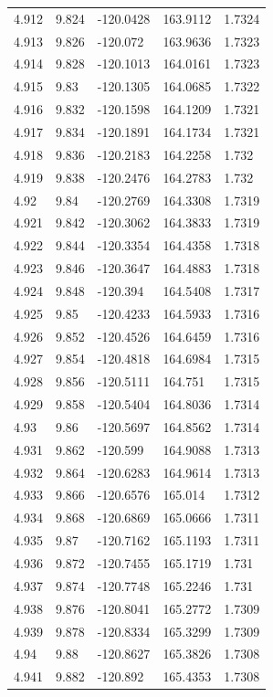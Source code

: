 \begin{tabular}{lllll}
4.912 & 9.824 & -120.0428 & 163.9112 & 1.7324 \\
4.913 & 9.826 & -120.072 & 163.9636 & 1.7323 \\
4.914 & 9.828 & -120.1013 & 164.0161 & 1.7323 \\
4.915 & 9.83 & -120.1305 & 164.0685 & 1.7322 \\
4.916 & 9.832 & -120.1598 & 164.1209 & 1.7321 \\
4.917 & 9.834 & -120.1891 & 164.1734 & 1.7321 \\
4.918 & 9.836 & -120.2183 & 164.2258 & 1.732 \\
4.919 & 9.838 & -120.2476 & 164.2783 & 1.732 \\
4.92 & 9.84 & -120.2769 & 164.3308 & 1.7319 \\
4.921 & 9.842 & -120.3062 & 164.3833 & 1.7319 \\
4.922 & 9.844 & -120.3354 & 164.4358 & 1.7318 \\
4.923 & 9.846 & -120.3647 & 164.4883 & 1.7318 \\
4.924 & 9.848 & -120.394 & 164.5408 & 1.7317 \\
4.925 & 9.85 & -120.4233 & 164.5933 & 1.7316 \\
4.926 & 9.852 & -120.4526 & 164.6459 & 1.7316 \\
4.927 & 9.854 & -120.4818 & 164.6984 & 1.7315 \\
4.928 & 9.856 & -120.5111 & 164.751 & 1.7315 \\
4.929 & 9.858 & -120.5404 & 164.8036 & 1.7314 \\
4.93 & 9.86 & -120.5697 & 164.8562 & 1.7314 \\
4.931 & 9.862 & -120.599 & 164.9088 & 1.7313 \\
4.932 & 9.864 & -120.6283 & 164.9614 & 1.7313 \\
4.933 & 9.866 & -120.6576 & 165.014 & 1.7312 \\
4.934 & 9.868 & -120.6869 & 165.0666 & 1.7311 \\
4.935 & 9.87 & -120.7162 & 165.1193 & 1.7311 \\
4.936 & 9.872 & -120.7455 & 165.1719 & 1.731 \\
4.937 & 9.874 & -120.7748 & 165.2246 & 1.731 \\
4.938 & 9.876 & -120.8041 & 165.2772 & 1.7309 \\
4.939 & 9.878 & -120.8334 & 165.3299 & 1.7309 \\
4.94 & 9.88 & -120.8627 & 165.3826 & 1.7308 \\
4.941 & 9.882 & -120.892 & 165.4353 & 1.7308 \\

\end{tabular}
